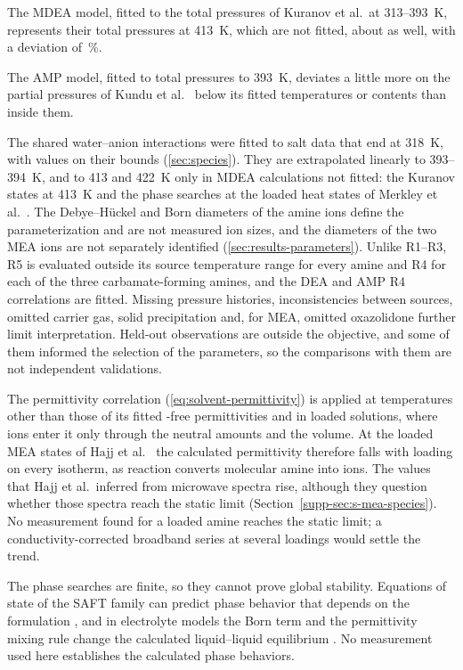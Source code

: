 The MDEA model, fitted to the total pressures of Kuranov et al.\ at 313--\SI{393}{\kelvin}, represents their  total pressures at \SI{413}{\kelvin}, which are not fitted, about as well, with a deviation of \,\%.

The AMP model, fitted to total pressures to \SI{393}{\kelvin}, deviates a little more on the \COtwo partial pressures of Kundu et al.\ \cite{kunduVaporLiquidEquilibriumCO22003} below its fitted temperatures or contents than inside them.

The shared water--anion interactions were fitted to salt data that end at \SI{318}{\kelvin}, with  values on their bounds (\cref{sec:species}).
They are extrapolated linearly to 393--\SI{394}{\kelvin}, and to 413 and \SI{422}{\kelvin} only in MDEA calculations not fitted: the Kuranov states at \SI{413}{\kelvin} and the phase searches at the loaded heat states of Merkley et al.\ \cite{merkleyEnthalpiesAbsorptionCarbon1987}.
The Debye--H\"uckel and Born diameters of the amine ions define the parameterization and are not measured ion sizes, and the diameters of the two MEA ions are not separately identified (\cref{sec:results-parameters}).
Unlike R1--R3, R5 is evaluated outside its source temperature range for every amine and R4 for each of the three carbamate-forming amines, and the DEA and AMP R4 correlations are fitted.
Missing pressure histories, inconsistencies between sources, omitted carrier gas, solid precipitation and, for MEA, omitted oxazolidone further limit interpretation.
Held-out observations are outside the objective, and some of them informed the selection of the parameters, so the comparisons with them are not independent validations.

The permittivity correlation (\cref{eq:solvent-permittivity}) is applied at temperatures other than those of its fitted \COtwo-free permittivities and in loaded solutions, where ions enter it only through the neutral amounts and the volume.
At the loaded MEA states of Hajj et al.\ \cite{Hajj2024} the calculated permittivity therefore falls with loading on every isotherm, as reaction converts molecular amine into ions.
The values that Hajj et al.\ inferred from microwave spectra rise, although they question whether those spectra reach the static limit (Section~\ref{supp-sec:s-mea-species}).
No measurement found for a loaded amine reaches the static limit; a conductivity-corrected broadband series at several loadings would settle the trend.

The phase searches are finite, so they cannot prove global stability.
Equations of state of the SAFT family can predict phase behavior that depends on the formulation \cite{privatAreSafeResults2010,yelashGlobalInvestigationPhase2005,polishukNumericalPitfallsCharacteristic2010}, and in electrolyte models the Born term and the permittivity mixing rule change the calculated liquid--liquid equilibrium \cite{AscaniHeld2021,Yang2024}.
No measurement used here establishes the calculated phase behaviors.
